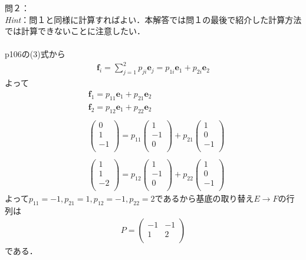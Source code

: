 \documentclass[dvipdfmx,uplatex,11pt]{jsarticle}
\begin{document}
問２： \\
\textsl{Hint}：問１と同様に計算すればよい．本解答では問１の最後で紹介した計算方法では計算できないことに注意したい．\\ \\
p106の(3)式から
\begin{eqnarray*}
\bm{f}_i=\sum^{2}_{j=1}p_{ji}\bm{e}_{j}=p_{1i}\bm{e}_1+p_{2i}\bm{e}_2
\end{eqnarray*}
よって
\begin{eqnarray*}
& \bm{f}_1=p_{11}\bm{e}_1+p_{21}\bm{e}_2 \\
& \bm{f}_2=p_{12}\bm{e}_1+p_{22}\bm{e}_2 \\ \\
&
\begin{pmatrix}
0 \\
1 \\
-1 \\
\end{pmatrix}
=
p_{11}
\begin{pmatrix}
1 \\
-1 \\
0 \\
\end{pmatrix}
+p_{21}
\begin{pmatrix}
1 \\
0 \\
-1 \\
\end{pmatrix}
\\ \\
&
\begin{pmatrix}
1 \\
1 \\
-2 \\
\end{pmatrix}
=
p_{12}
\begin{pmatrix}
1 \\
-1 \\
0 \\
\end{pmatrix}
+p_{22}
\begin{pmatrix}
1 \\
0 \\
-1 \\
\end{pmatrix}
\end{eqnarray*}
よって$p_{11}=-1,p_{21}=1,p_{12}=-1,p_{22}=2$であるから基底の取り替え$E→F$の行列は
\begin{eqnarray*}
P=
\begin{pmatrix}
-1 & -1 \\
1 & 2 \\
\end{pmatrix}
\end{eqnarray*}
である．
%
%
%
\newpage
%
%
%
\end{document}
